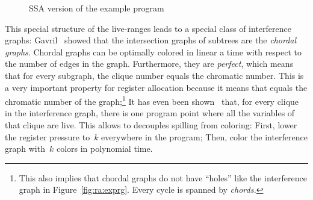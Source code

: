 {\begin{figure}[htbp]
	\begin{center}
		\qquad
	\end{center}
	\caption{SSA version of the example program}
	\label{fig:ra:exprgssa}
\end{figure}

This special structure of the live-ranges leads to a special class of interference graphs:
Gavril~\cite{gavril:1974:trees} showed that the intersection graphs of subtrees are the \emph{chordal graphs}.
Chordal graphs can be optimally colored in linear a time with respect to the number of edges in the graph.
Furthermore, they are \emph{perfect}, which means that for every subgraph, the clique number equals the chromatic number. 
This is a very important property for register allocation because it means that \maxlive equals the chromatic number of the graph;\footnote{
This also implies that chordal graphs do not have ``holes'' like the interference graph in Figure~\ref{fig:ra:exprg}.
Every cycle is spanned by \emph{chords.}
}
It has even been shown~\cite{Bouchez05:RR,HGG:2006:RA_SSA} that, for every clique in the interference graph, there is one program point where all the variables of that clique are live.
This allows to decouples spilling from coloring:
First, lower the register pressure to~$k$ everywhere in the program;
Then, color the interference graph with~$k$ colors in polynomial time.


}
